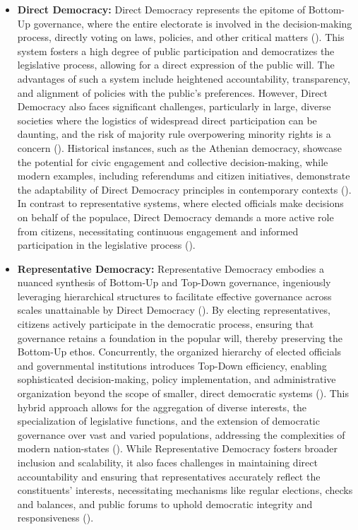 \documentclass{article}
\begin{document}
\begin{itemize}
    \item \textbf{Direct Democracy:} Direct Democracy represents the epitome of Bottom-Up governance, where the entire electorate is involved in the decision-making process, directly voting on laws, policies, and other critical matters (\cite{democracyText}). This system fosters a high degree of public participation and democratizes the legislative process, allowing for a direct expression of the public will. The advantages of such a system include heightened accountability, transparency, and alignment of policies with the public's preferences. However, Direct Democracy also faces significant challenges, particularly in large, diverse societies where the logistics of widespread direct participation can be daunting, and the risk of majority rule overpowering minority rights is a concern (\cite{ober}). Historical instances, such as the Athenian democracy, showcase the potential for civic engagement and collective decision-making, while modern examples, including referendums and citizen initiatives, demonstrate the adaptability of Direct Democracy principles in contemporary contexts (\cite{modernReferendums}). In contrast to representative systems, where elected officials make decisions on behalf of the populace, Direct Democracy demands a more active role from citizens, necessitating continuous engagement and informed participation in the legislative process (\cite{comparativeDemocracy}).
    \item \textbf{Representative Democracy:} Representative Democracy embodies a nuanced synthesis of Bottom-Up and Top-Down governance, ingeniously leveraging hierarchical structures to facilitate effective governance across scales unattainable by Direct Democracy (\cite{dahl}). By electing representatives, citizens actively participate in the democratic process, ensuring that governance retains a foundation in the popular will, thereby preserving the Bottom-Up ethos. Concurrently, the organized hierarchy of elected officials and governmental institutions introduces Top-Down efficiency, enabling sophisticated decision-making, policy implementation, and administrative organization beyond the scope of smaller, direct democratic systems (\cite{federalist}). This hybrid approach allows for the aggregation of diverse interests, the specialization of legislative functions, and the extension of democratic governance over vast and varied populations, addressing the complexities of modern nation-states (\cite{comparativePolitics}). While Representative Democracy fosters broader inclusion and scalability, it also faces challenges in maintaining direct accountability and ensuring that representatives accurately reflect the constituents' interests, necessitating mechanisms like regular elections, checks and balances, and public forums to uphold democratic integrity and responsiveness (\cite{democracyTheory}).
\end{itemize}
\end{document}
